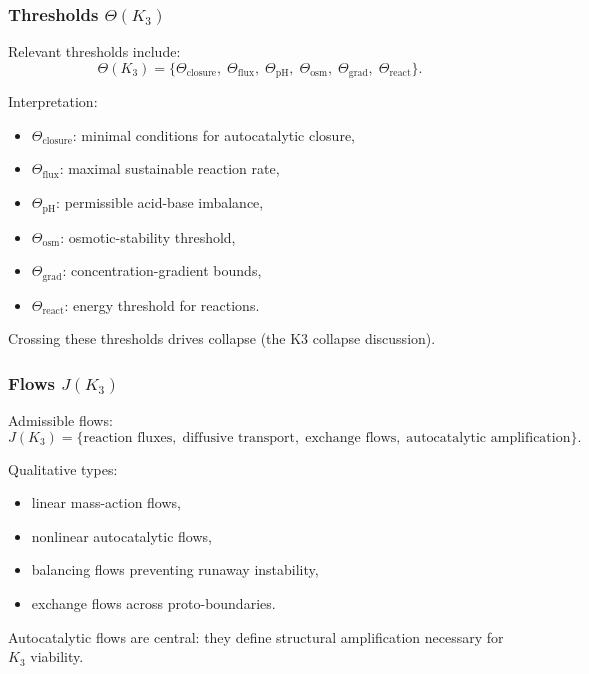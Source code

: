 \subsubsection{Thresholds \texorpdfstring{$\Theta(K_3)$}{\Theta(K_3)}}

Relevant thresholds include:
\[
\Theta(K_3) =
\{\Theta_{\mathrm{closure}},\;
  \Theta_{\mathrm{flux}},\;
  \Theta_{\mathrm{pH}},\;
  \Theta_{\mathrm{osm}},\;
  \Theta_{\mathrm{grad}},\;
  \Theta_{\mathrm{react}}\}.
\]

Interpretation:
\begin{itemize}
    \item $\Theta_{\mathrm{closure}}$: minimal conditions for
          autocatalytic closure,
    \item $\Theta_{\mathrm{flux}}$: maximal sustainable reaction rate,
    \item $\Theta_{\mathrm{pH}}$: permissible acid-base imbalance,
    \item $\Theta_{\mathrm{osm}}$: osmotic-stability threshold,
    \item $\Theta_{\mathrm{grad}}$: concentration-gradient bounds,
    \item $\Theta_{\mathrm{react}}$: energy threshold for reactions.
\end{itemize}

Crossing these thresholds drives collapse (the K3 collapse discussion).

\subsubsection{Flows \texorpdfstring{$J(K_3)$}{J(K_3)}}

Admissible flows:
\[
J(K_3) = \{\text{reaction fluxes},\; \text{diffusive transport},\;
         \text{exchange flows},\; \text{autocatalytic amplification}\}.
\]

Qualitative types:
\begin{itemize}
    \item linear mass-action flows,
    \item nonlinear autocatalytic flows,
    \item balancing flows preventing runaway instability,
    \item exchange flows across proto-boundaries.
\end{itemize}

Autocatalytic flows are central: they define structural amplification
necessary for $K_3$ viability.

